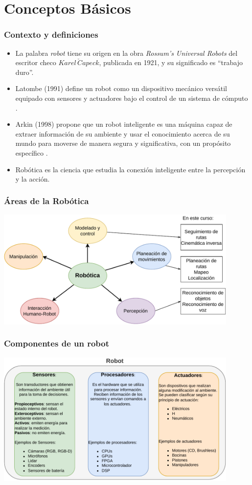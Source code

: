 \documentclass[10pt,spanish,aspectratio=1610]{beamer}
\begin{document}
\section{Conceptos Básicos}
\begin{frame}\frametitle{Contexto y definiciones}
  \begin{itemize}
  \item La palabra \textit{robot} tiene su origen en la obra \textit{Rossum's Universal Robots} del escritor checo $Karel \,\check{C}apeck$, publicada en 1921, y su significado es ``trabajo duro''.
  \item Latombe (1991) define un robot como un dispositivo mecánico versátil equipado con sensores y actuadores bajo el control de un sistema de cómputo \cite{Latombe1991MotionPlanning}.
  \item Arkin (1998) propone que un robot inteligente es una máquina capaz de extraer información de su ambiente y usar el conocimiento acerca de su mundo para moverse de manera segura y significativa, con un propósito específico \cite{Arkin1998BehBasedRobo}.
  \item Robótica es la ciencia que estudia la conexión inteligente entre la percepción y la acción. 
  \end{itemize}
\end{frame}

\begin{frame}\frametitle{Áreas de la Robótica}
  
  \includegraphics[width=0.9\textwidth]{Figures/RoboticsAreas.pdf}
\end{frame}

\begin{frame}\frametitle{Componentes de un robot}
  \includegraphics[width=0.9\textwidth]{Figures/RobotComponents.pdf}
\end{frame}
\end{document}
